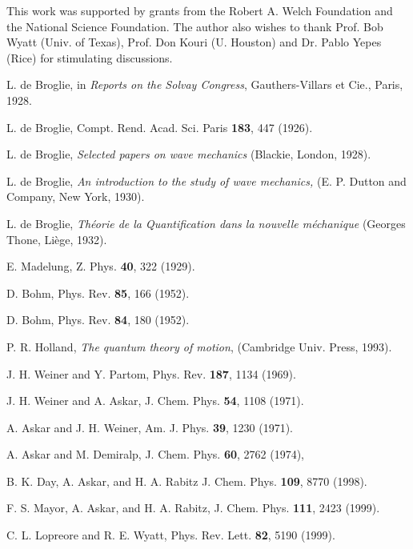 \acknowledgments This work was supported by grants from the Robert A. 
Welch Foundation and the National Science Foundation.  The author also 
wishes to thank Prof.  Bob Wyatt (Univ.  of Texas), Prof.  Don Kouri 
(U. Houston) and Dr.  Pablo Yepes (Rice) for stimulating discussions.





\begin{thebibliography}{10}

\bibitem{}
L. de Broglie, in { \em  Reports on the Solvay Congress}, 
Gauthers-Villars et Cie., Paris, 1928.


\bibitem
L. de Broglie, Compt.  Rend.  Acad.  Sci.  Paris {\bf 183}, 
447 (1926).


L. de Broglie, { \em  Selected papers on wave mechanics 
}(Blackie, London, 1928).


L. de Broglie, { \em  An introduction to the study of wave 
mechanics, }(E. P. Dutton and Company, New York, 1930).


L. de Broglie, { \em  Th\'eorie de la Quantification dans 
la nouvelle m\'echanique }(Georges Thone, Li\`ege, 1932).

E. Madelung, Z. Phys. {\bf 40}, 322 (1929).

D. Bohm, Phys.  Rev.  {\bf 85}, 166 (1952).


D. Bohm, Phys.  Rev.  {\bf 84}, 180 (1952).


 P. R. Holland, { \em  The quantum theory of motion}, (Cambridge 
Univ.  Press, 1993).


J. H. Weiner and Y. Partom, Phys.  Rev.  {\bf 187}, 1134 
(1969).


J. H. Weiner and A. Askar, J. Chem.  Phys.  {\bf 54}, 1108 
(1971).

A. Askar and J. H. Weiner,  Am. J. Phys. {\bf 39}, 1230 (1971).

A. Askar and M. Demiralp, J. Chem. Phys.  {\bf 60}, 2762 (1974),

B. K. Day, A. Askar, and H. A. Rabitz  J. Chem. Phys.  {\bf 109}, 8770 (1998).

F. S. Mayor, A. Askar, and H. A. Rabitz, J. Chem. Phys.  {\bf 111}, 
2423 (1999).

C. L. Lopreore and R. E. Wyatt, Phys. Rev. Lett.  {\bf 82}, 5190 (1999).


\end{thebibliography}
